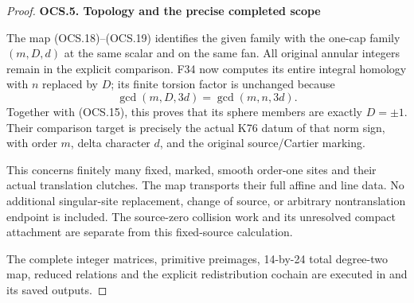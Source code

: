 \begin{proof}
\par

\medskip\noindent\textbf{OCS.5. Topology and the precise completed scope}

\par\nobreak

The map (OCS.18)--(OCS.19) identifies the given family with the
one-cap family \((m,D,d)\) at the same scalar and on the same fan.
All original annular integers remain in the explicit comparison.
F34 now computes its entire integral homology with \(n\) replaced
by \(D\); its finite torsion factor is unchanged because
\[
              \gcd(m,D,3d)=\gcd(m,n,3d).
\]
Together with (OCS.15), this proves that its sphere members are
exactly \(D=\pm1\). Their comparison target is precisely the
actual K76 datum of that norm sign, with order \(m\), delta
character \(d\), and the original source/Cartier marking.

This concerns finitely many fixed, marked, smooth order-one sites
and their actual translation clutches. The map transports their
full affine and line data. No additional singular-site replacement,
change of source, or arbitrary nontranslation endpoint is included.
The source-zero collision work and its unresolved compact
attachment are separate from this fixed-source calculation.

The complete integer matrices, primitive preimages, 14-by-24
total degree-two map, reduced relations and the explicit
redistribution cochain are executed in
 and its saved outputs.

\end{proof}
